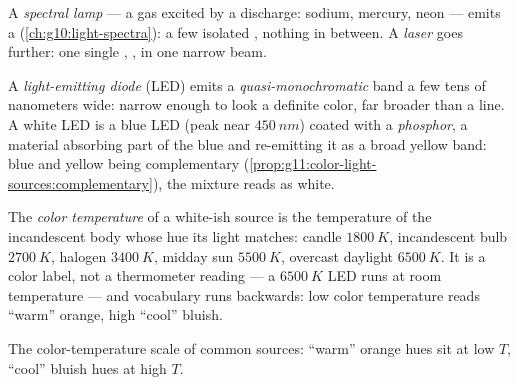 \begin{definition}\label{def:g11:color-light-sources:lamps}
A \emph{spectral lamp} --- a  gas
excited by a discharge: sodium, mercury, neon --- emits a 
(\cref{ch:g10:light-spectra}): a few isolated , nothing in
between. A \emph{laser} goes further: one single
, , in one narrow beam.
\end{definition}

\begin{definition}[LEDs]\label{def:g11:color-light-sources:led}
A \emph{light-emitting diode} (LED) emits a
\emph{quasi-monochromatic} band a few tens of nanometers wide: narrow
enough to look a definite color, far broader than a  line. A white
LED is a blue LED (peak near $\qty{450}{nm}$) coated with a
\emph{phosphor}, a material absorbing part of the blue
and re-emitting it as a broad yellow band: blue and yellow being
complementary (\cref{prop:g11:color-light-sources:complementary}), the
mixture reads as white.
\end{definition}

\begin{definition}\label{def:g11:color-light-sources:colortemp}
The \emph{color temperature} of a white-ish
source is the temperature of the incandescent body whose hue its light
matches: candle $\qty{1800}{K}$, incandescent bulb $\qty{2700}{K}$,
halogen $\qty{3400}{K}$, midday sun $\qty{5500}{K}$, overcast daylight
$\qty{6500}{K}$. It is a color label, not a thermometer reading --- a
$\qty{6500}{K}$ LED runs at room temperature --- and vocabulary runs
backwards: low color temperature reads ``warm'' orange, high ``cool''
bluish.
\end{definition}

\begin{omfigure}

{\small The color-temperature scale of common sources: ``warm'' orange
hues sit at low $T$, ``cool'' bluish hues at high $T$.}
\end{omfigure}

